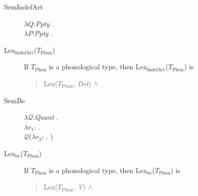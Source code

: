 \begin{description}
  
\item[\textnormal{SemIndefArt}] \mbox{}

  $\lambda Q$:\textit{Ppty} . \\
\hspace*{1em} $\lambda P$:\textit{Ppty}
. 

        
      \item[\textnormal{Lex$_{\mathrm{IndefArt}}$($T_{\mathrm{Phon}}$)}]
        \mbox{}

        If $T_{\mathrm{Phon}}$ is a phonological type, then
        Lex$_{\mathrm{IndefArt}}$($T_{\mathrm{Phon}}$) is
        \begin{quote}
          Lex($T_{\mathrm{Phon}}$, \textit{Det}) \d{$\wedge$}
        \end{quote}
        
      \item[\textnormal{SemBe}] \mbox{}

        $\lambda\mathcal{Q}$:\textit{Quant} . \\
\hspace*{1em} $\lambda r_1$:
. \\
\hspace*{2em} $\mathcal{Q}$($\lambda
r_2$:
. )

\item[\textnormal{Lex$_{\mathrm{be}}$($T_{\mathrm{Phon}}$)}] \mbox{}

  If $T_{\mathrm{Phon}}$ is a phonological type, then
  Lex$_{\mathrm{be}}$($T_{\mathrm{Phon}}$) is
\begin{quote}
  Lex($T_{\mathrm{Phon}}$,
\textit{V}) \d{$\wedge$}
\end{quote}
  
        

  
  
\end{description}


